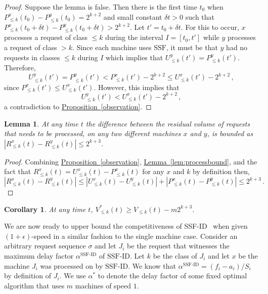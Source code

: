 \documentclass[10pt]{article}
\newtheorem{lemma}[theorem]{Lemma}
\newtheorem{corollary}[theorem]{Corollary}
\theoremstyle{definition}
\numberwithin{equation}{section}
\newcommand{\expref}[2]{\texorpdfstring{\hyperref[#2]{#1~\ref{#2}}}{#1~\ref{#2}}}
\newcommand{\eps}{\epsilon}
\newcommand{\Algorithm}[1]{{\textrm{#1}}} %
\newcommand{\sug}{\Algorithm{SSF}} %
\newcommand{\mmug}{\Algorithm{SSF-ID}} %
\begin{document}
\begin{proof}
  Suppose the lemma is false. Then there is the first time $t_0$ when
  $P^{x}_{\leq k} (t_0) - P^{y}_{\leq k} (t_0) = 2^{k+2}$ and small
  constant $\delta t > 0$ such that $P^{x}_{\leq k} (t_0 + \delta t) -
  P^{y}_{\leq k} (t_0 + \delta t) > 2^{k+2}$. Let $t' = t_0+\delta t$.
  For this to occur, $x$ processes a request of class $\le k$ during
  the interval $I = [t_0, t']$ while $y$ processes a request of class
  $> k$. Since each machine uses $\sug$, it must be that $y$ had no
  requests in classes $\le k$ during $I$ which implies that $U^y_{\le
    k}(t') = P^y_{\le k}(t')$. Therefore,
\[
U^{y}_{\leq k} (t') = P^{y}_{\leq k} (t') < P^{x}_{\leq k} (t') - 2^{k+2}
\le U^{x}_{\leq k} (t') - 2^{k+2}\,,
\]
since $P^{x}_{\leq k} (t') \le U^{x}_{\leq k} (t')$. However, this implies
that
\[
U^{y}_{\leq k} (t') < U^{x}_{\leq k} (t')  - 2^{k+2}\,,
\]
a contradiction to \expref{Proposition}{observation}.
\end{proof}


\begin{lemma}
  \label{lem:closebound} At any time $t$ the difference between the
  residual volume of requests that needs to be processed, on any two
  different machines $x$ and $y$, is bounded as $|R^{x}_{\leq k} (t) -
  R^{y}_{\leq k}(t)| \leq 2^{k+3}$.
\end{lemma}

\begin{proof}
Combining \expref{Proposition}{observation}, \expref{Lemma}{lem:processbound},
and the fact that $R^{x}_{\leq k}(t) = U^{x}_{\leq k}(t) - P^{x}_{\leq k}(t)$ for any $x$ and $k$ by definition then,
\[
|R^{x}_{\leq k} (t) -  R^{y}_{\leq k}(t)| \le
|U^{x}_{\leq k} (t) -  U^{y}_{\leq k}(t)| + |P^{x}_{\leq k} (t) -  P^{y}_{\leq k}(t)| \le 2^{k+3}\,.
\]
\end{proof}


\begin{corollary}
  \label{cor:optarrival} At any time $t$, $V^*_{\leq k} (t) \geq V_{\leq
    k} (t) - m2^{k+3}$.
\end{corollary}

%
%
%
%
%

We are now ready to upper bound the competitiveness of \mmug~ when given $(1+\eps)$-speed in a similar fashion to the single machine
case. Consider an arbitrary request sequence $\sigma$ and let $J_i$ be
the request that witnesses the maximum delay factor $\alpha^\mmug$ of $\mmug$. Let $k$ be the class of $J_i$ and let $x$ be the machine $J_i$ was processed on by $\mmug$.  We know that $\alpha^\mmug = (f_i - a_i)/S_i$ by definition of $J_i$. We use $\alpha^*$ to denote the delay factor of some fixed optimal
algorithm that uses $m$ machines of speed $1$.
\end{document}
